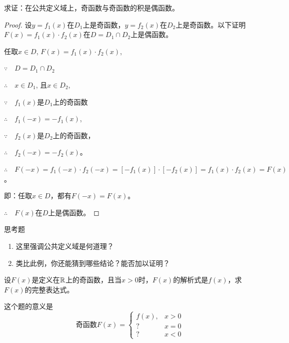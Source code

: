 \begin{example}
    求证：在公共定义域上，奇函数与奇函数的积是偶函数。
\end{example}

\begin{proof}
    设$y=f_1(x)$在$D_1$上是奇函数，$y=f_2(x)$在$D_2$上是奇函数。以下证明$F(x)=f_1(x)\cdot f_2(x)$在$D=D_1\cap D_2$上是偶函数。

任取$x\in D$, $F(x)=f_1(x)\cdot f_2(x)$,

$\because\quad D=D_1\cap D_2$

$\therefore\quad x\in D_1$, 且$x\in D_2$,

$\because\quad f_1(x)$是$D_1$上的奇函数

$\therefore\quad f_1(-x)=-f_1(x)$,

$\because\quad f_2(x)$是$D_2$上的奇函数，

$\therefore\quad f_2(-x)=-f_2(x)$。

$\therefore\quad F(-x)=f_1(-x)\cdot f_2(-x)=[-f_1(x)]\cdot [-f_2(x)]
=f_1(x)\cdot f_2(x)=F(x)$。

即：任取$x\in D$，都有$F(-x)=F(x)$。

$\therefore\quad F(x)$在$D$上是偶函数。
\end{proof}

\begin{thm}{思考题}
\begin{enumerate}[(1)]
    \item 这里强调公共定义域是何道理？
    \item 类比此例，你还能猜到哪些结论？能否加以证明？
\end{enumerate}
\end{thm}

\begin{example}
    设$F(x)$是定义在$\mathbb{R}$上的奇函数，且当$x>0$时，$F(x)$的解析式是$f(x)$，求$F(x)$的完整表达式。
\end{example}

\begin{analyze}
    这个题的意义是
\[\text{奇函数}F(x)=\begin{cases}
    f(x), & x>0\\
    ?&x=0\\
    ?&x<0
\end{cases}\]
\end{analyze}

